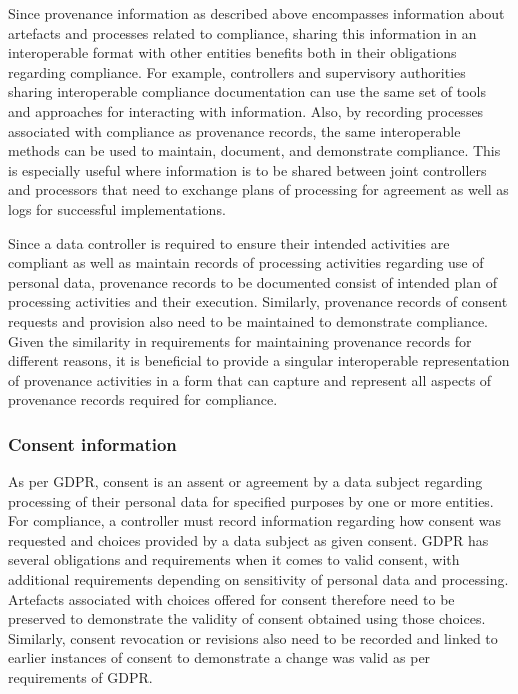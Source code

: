 Since provenance information as described above encompasses information about artefacts and processes related to compliance, sharing this information in an interoperable format with other entities benefits both in their obligations regarding compliance. For example, controllers and supervisory authorities sharing interoperable compliance documentation can use the same set of tools and approaches for interacting with information. Also, by recording processes associated with compliance as provenance records, the same interoperable methods can be used to maintain, document, and demonstrate compliance. This is especially useful where information is to be shared between joint controllers and processors that need to exchange plans of processing for agreement as well as logs for successful implementations.

Since a data controller is required to ensure their intended activities are compliant as well as maintain records of processing activities regarding use of personal data, provenance records to be documented consist of intended plan of processing activities and their execution. Similarly, provenance records of consent requests and provision also need to be maintained to demonstrate compliance. Given the similarity in requirements for maintaining provenance records for different reasons, it is beneficial to provide a singular interoperable representation of provenance activities in a form that can capture and represent all aspects of provenance records required for compliance.

\subsubsection*{Consent information}
As per GDPR, consent is an assent or agreement by a data subject regarding processing of their personal data for specified purposes by one or more entities. 
For compliance, a controller must record information regarding how consent was requested and choices provided by a data subject as given consent.
GDPR has several obligations and requirements when it comes to valid consent, with additional requirements depending on sensitivity of personal data and processing. 
Artefacts associated with choices offered for consent therefore need to be preserved to demonstrate the validity of consent obtained using those choices.
Similarly, consent revocation or revisions also need to be recorded and linked to earlier instances of consent to demonstrate a change was valid as per requirements of GDPR.

